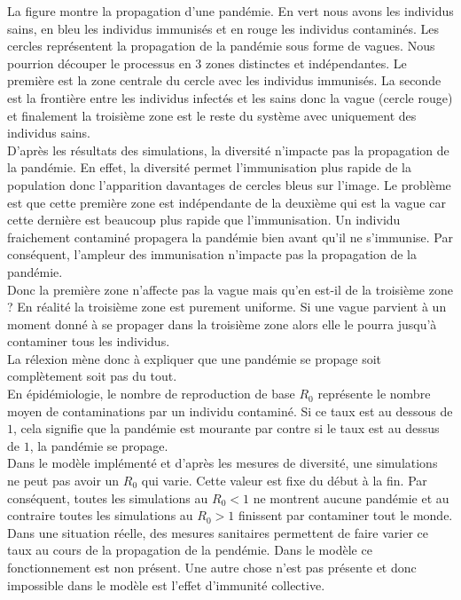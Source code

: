 La figure montre la propagation d'une pandémie. En vert nous avons les individus sains, en bleu les individus immunisés et en rouge les individus contaminés. Les cercles représentent la propagation de la pandémie sous forme de vagues. Nous pourrion découper le processus en 3 zones distinctes et indépendantes. Le première est la zone centrale du cercle avec les individus immunisés. La seconde est la frontière entre les individus infectés et les sains donc la vague (cercle rouge) et finalement la troisième zone est le reste du système avec uniquement des individus sains.\\

D'après les résultats des simulations, la diversité n'impacte pas la propagation de la pandémie. En effet, la diversité permet l'immunisation plus rapide de la population donc l'apparition davantages de cercles bleus sur l'image. Le problème est que cette première zone est indépendante de la deuxième qui est la vague car cette dernière est beaucoup plus rapide que l'immunisation. Un individu fraichement contaminé propagera la pandémie bien avant qu'il ne s'immunise. Par conséquent, l'ampleur des immunisation n'impacte pas la propagation de la pandémie.\\

Donc la première zone n'affecte pas la vague mais qu'en est-il de la troisième zone ? En réalité la troisième zone est purement uniforme. Si une vague parvient à un moment donné à se propager dans la troisième zone alors elle le pourra jusqu'à contaminer tous les individus.\\

La rélexion mène donc à expliquer que une pandémie se propage soit complètement soit pas du tout.\\

En épidémiologie, le nombre de reproduction de base $R_0$ représente le nombre moyen de contaminations par un individu contaminé. Si ce taux est au dessous de $1$, cela signifie que la pandémie est mourante par contre si le taux est au dessus de $1$, la pandémie se propage.\\

Dans le modèle implémenté et d'après les mesures de diversité, une simulations ne peut pas avoir un $R_0$ qui varie. Cette valeur est fixe du début à la fin. Par conséquent, toutes les simulations au $R_0 < 1$ ne montrent aucune pandémie et au contraire toutes les simulations au $R_0 > 1$ finissent par contaminer tout le monde. Dans une situation réelle, des mesures sanitaires permettent de faire varier ce taux au cours de la propagation de la pendémie. Dans le modèle ce fonctionnement est non présent. Une autre chose n'est pas présente et donc impossible dans le modèle est l'effet d'immunité collective.\\

